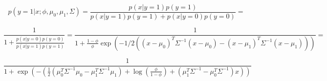 \begin{answer}

\begin{equation*}
	p(y=1|x; \phi, \mu_0, \mu_1, \Sigma) =  \frac{p(x|y=1)p(y=1)}{p(x|y=1)p(y=1) + p(x|y=0)p(y=0)} = 
\end{equation*}

\begin{equation*}
	\frac{1}{1 + \frac{p(x|y=0)p(y=0)}{p(x|y=1)p(y=1)}} = \frac{1}{1 + \frac{1-\phi}{\phi} \exp(-1/2( (x-\mu_{0})^T \Sigma^{-1} (x-\mu_{0}) - (x-\mu_{1})^T \Sigma^{-1} (x-\mu_{1}) ))} = 
\end{equation*}

\begin{equation*}
\frac{1}{1 + \exp(-(\frac{1}{2}( \mu_{0}^T \Sigma^{-1} \mu_{0} - \mu_{1}^T \Sigma^{-1} \mu_{1} ) + \log(\frac{\phi}{1 - \phi}) + (\mu_1^T\Sigma^{-1} - \mu_0^T\Sigma^{-1})x))}
\end{equation*}

\end{answer}
